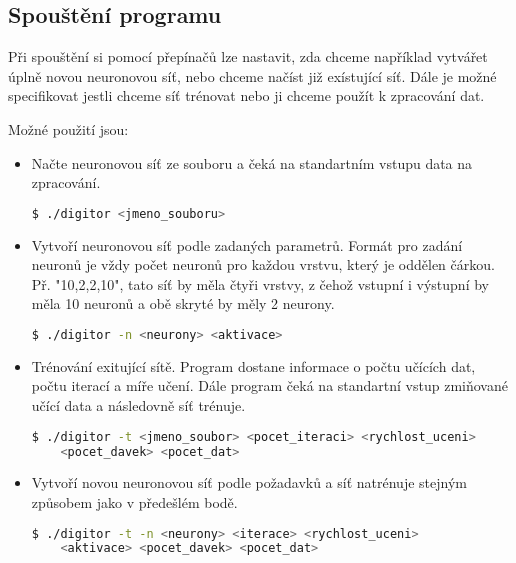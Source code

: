 \subsection{Spouštění programu}
Při spouštění si pomocí přepínačů lze nastavit, zda chceme například vytvářet úplně novou neuronovou síť, nebo chceme načíst již exístující síť. Dále je možné specifikovat jestli chceme síť trénovat nebo ji chceme použít k zpracování dat.

Možné použití jsou:
\begin{itemize}
    \item Načte neuronovou síť ze souboru a čeká na standartním vstupu data na zpracování.
    \begin{lstlisting}[language=bash, backgroundcolor=\color{backcolor}]
 $ ./digitor <jmeno_souboru>
    \end{lstlisting}

    \item Vytvoří neuronovou síť podle zadaných parametrů.
    Formát pro zadání neuronů je vždy počet neuronů pro každou vrstvu, který je oddělen čárkou.
    Př. "10,2,2,10", tato síť by měla čtyři vrstvy, z čehož vstupní i výstupní by měla 10 neuronů a obě skryté by měly 2 neurony.
    \begin{lstlisting}[language=bash, backgroundcolor=\color{backcolor}]
 $ ./digitor -n <neurony> <aktivace>
    \end{lstlisting}

    \item Trénování exitující sítě. Program dostane informace o počtu učících dat, počtu iterací a míře učení.
    Dále program čeká na standartní vstup zmiňované učící data a následovně síť trénuje.
    \begin{lstlisting}[language=bash, backgroundcolor=\color{backcolor}]
 $ ./digitor -t <jmeno_soubor> <pocet_iteraci> <rychlost_uceni>
    <pocet_davek> <pocet_dat>
    \end{lstlisting}

    \item Vytvoří novou neuronovou síť podle požadavků a síť natrénuje stejným způsobem jako v předešlém bodě.
    \begin{lstlisting}[language=bash, backgroundcolor=\color{backcolor}]
 $ ./digitor -t -n <neurony> <iterace> <rychlost_uceni>
    <aktivace> <pocet_davek> <pocet_dat>
    \end{lstlisting}
\end{itemize}
\newpage